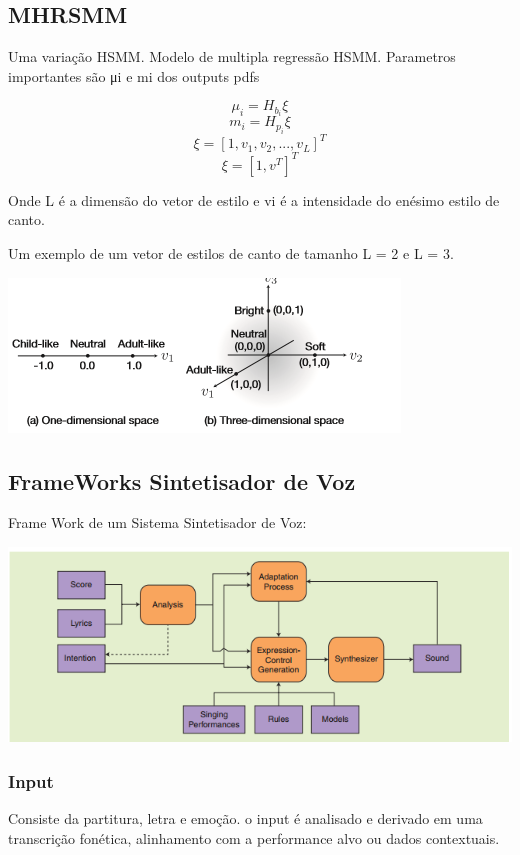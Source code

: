 		\subsection{MHRSMM}
		Uma variação HSMM. Modelo de multipla regressão HSMM.
		Parametros importantes são μi e mi dos outputs pdfs
		
		\[ \mu_i = H_b_i \xi \] 
		\[	m_i   = H_p_i \xi  \]
		\[ \xi   = [1,v_1,v_2,...,v_L]^T \]	
		\[ \xi   = [1,v^T]^T	\]	
		
		Onde L é a dimensão do vetor de estilo e vi  é  a intensidade do  enésimo estilo de canto.
		
		Um exemplo de um vetor de estilos de canto de tamanho L =  2 e L = 3.
		
		\includegraphics{exemploHMM.png}
	
		
	
	\subsection{FrameWorks Sintetisador de Voz}
	
		Frame Work de um Sistema Sintetisador de Voz:
		
		\includegraphics{frameWork.png}
		
		\subsubsection{Input}
		Consiste da partitura, letra e emoção.
		o input é analisado e derivado em uma transcrição fonética, alinhamento com a performance alvo ou dados contextuais.\cite{FrameWork}\linebreak
		
